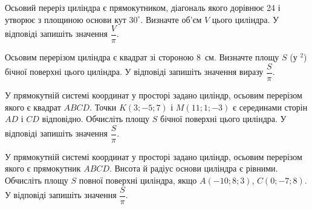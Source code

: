 \documentclass[12pt]{article}
\begin{document}

\begin{samepage}
\noindent\zadnum Осьовий переріз циліндра є прямокутником, діагональ якого дорівнює 24 і утворює з площиною основи кут $30^\circ$. Визначте об’єм $V$ цього циліндра. У відповіді запишіть значення $\dfrac{V}{\pi}$. 

\nmtnobreak
\nopagebreak\nbvspace{0.5cm}
\nmtAnswerBox
\par{}
\end{samepage}

\begin{samepage}
\noindent\zadnum Осьовим перерізом циліндра є квадрат зі стороною 8~см. Визначте площу $S$ (у $^2$) бічної поверхні цього циліндра. У відповіді запишіть значення виразу $\dfrac{S}{\pi}$. 

\nmtnobreak
\nopagebreak\nbvspace{0.5cm}
\nmtAnswerBox
\par{}
\end{samepage}

\begin{samepage}
\noindent\zadnum У прямокутній системі координат у просторі задано циліндр, осьовим перерізом якого є квадрат $ABCD$. Точки $K(3; -5; 7)$ і $M(11; 1; -3)$ є серединами сторін $AD$ і $CD$ відповідно. Обчисліть площу $S$ бічної поверхні цього циліндра. У відповіді запишіть значення $\dfrac{S}{\pi}$. 

\nmtnobreak
\nopagebreak\nbvspace{0.5cm}
\nmtAnswerBox
\par{}
\end{samepage}

\begin{samepage}
\noindent\zadnum У прямокутній системі координат у просторі задано циліндр, осьовим перерізом якого є прямокутник $ABCD$. Висота й радіус основи циліндра є рівними. Обчисліть площу $S$ повної поверхні циліндра, якщо $A(-10; 8; 3)$, $C(0; -7; 8)$. У відповіді запишіть значення $\dfrac{S}{\pi}$. 

\nmtnobreak
\nopagebreak\nbvspace{0.5cm}
\nmtAnswerBox
\par{}
\end{samepage}
\end{document}
